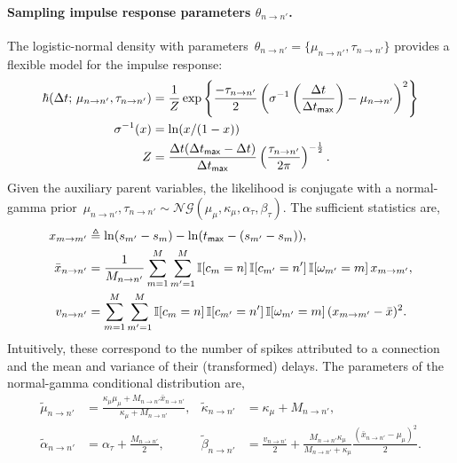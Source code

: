 \paragraph{Sampling impulse response parameters $\theta_{n \to n'}$.}
The logistic-normal density with parameters~${\theta_{n \to
    n'}=\{\mu_{n \to n'},\tau_{n \to n'}\}}$ provides a flexible model
for the impulse response:
\begin{align*}
  \hbar(\Delta t ; \,  \mu_{n \to n'}, \tau_{n \to n'})
  &=\frac{1}{Z}\exp\left\{\frac{-\tau_{n \to n'}}{2}
  \left(\sigma^{-1}\left(\frac{\Delta t}{\Delta t_{\mathsf{max}}}\right)
  - \mu_{n \to n'} \right)^2 \right\} \\
  \sigma^{-1}(x) &= \ln(x/(1-x))\\ Z &=
  \frac{\Delta t(\Delta t_{\sf{max}}-\Delta t)}{\Delta t_{\mathsf{max}}}
  \left(\frac{\tau_{n \to n'}}{2\pi}\right)^{-\frac{1}{2}}.
\end{align*}
Given the auxiliary parent variables, the likelihood is conjugate with
a normal-gamma prior~${\mu_{n \to n'},\tau_{n \to n'} \sim
  \mathcal{NG}(\mu_\mu,\kappa_\mu,\alpha_\tau,\beta_\tau)}$.
The sufficient statistics are,
\begin{align*}
x_{m \to m'} &\triangleq \ln(s_{m'}-s_m)-\ln(t_{\sf{max}}-(s_{m'}-s_m)), \\
\bar{x}_{n \to n'} &= \frac{1}{M_{n \to n'}} \sum_{m=1}^M \sum_{m'=1}^M \mathbb{I}[c_m=n] \, \mathbb{I}[c_{m'}=n'] \, \mathbb{I}[\omega_{m'}=m] \,x_{m \to m'}, \\
v_{n \to n'} &= \sum_{m=1}^M \sum_{m'=1}^M \mathbb{I}[c_m=n] \, \mathbb{I}[c_{m'}=n'] \, \mathbb{I}[\omega_{m'}=m] \, (x_{m \to m'} - \bar{x})^2.
\end{align*}
Intuitively, these correspond to the number of spikes attributed to a
connection and the mean and variance of their (transformed) delays.
The parameters of the normal-gamma conditional distribution are,
\begin{align*}
  \widetilde{\mu}_{n \to n'} &= \frac{\kappa_\mu \mu_\mu + M_{n \to n'} \bar{x}_{n \to n'}}{\kappa_\mu + M_{n \to n'}}, 
  &
  \widetilde{\kappa}_{n \to n'} &= \kappa_\mu + M_{n \to n'}, \\
  \widetilde{\alpha}_{n \to n'} &= \alpha_{\tau} + \frac{M_{n \to n'}}{2},
  & 
  \widetilde{\beta}_{n \to n'} &= \frac{v_{n \to n'}}{2} + \frac{M_{n \to n'} \kappa_\mu}{M_{n \to n'} + \kappa_\mu}\frac{(\bar{x}_{n \to n'} - \mu_\mu)^2}{2}.
\end{align*}

